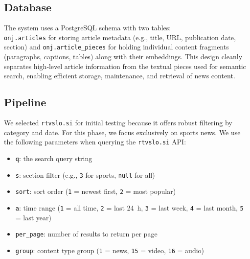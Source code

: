 \documentclass[fleqn,moreauthors,10pt]{ds_report}
\begin{document}
\subsection{Database}

The system uses a PostgreSQL schema with two tables: \\ \texttt{onj.articles} for storing article metadata (e.g., title, URL, publication date, section) and \texttt{onj.article\_pieces} for holding individual content fragments (paragraphs, captions, tables) along with their embeddings. This design cleanly separates high‑level article information from the textual pieces used for semantic search, enabling efficient storage, maintenance, and retrieval of news content.  

\subsection*{Pipeline}

We selected \texttt{rtvslo.si} for initial testing because it offers robust filtering by category and date. For this phase, we focus exclusively on sports news. We use the following parameters when querying the \texttt{rtvslo.si} API:

\begin{itemize}
  \item \texttt{q}: the search query string
  \item \texttt{s}: section filter (e.g., \texttt{3} for sports, \texttt{null} for all)
  \item \texttt{sort}: sort order (\texttt{1} = newest first, \texttt{2} = most popular)
  \item \texttt{a}: time range (\texttt{1} = all time, \texttt{2} = last 24 h, \texttt{3} = last week, \texttt{4} = last month, \texttt{5} = last year)
  \item \texttt{per\_page}: number of results to return per page
  \item \texttt{group}: content type group (\texttt{1} = news, \texttt{15} = video, \texttt{16} = audio)
\end{itemize}
\end{document}
